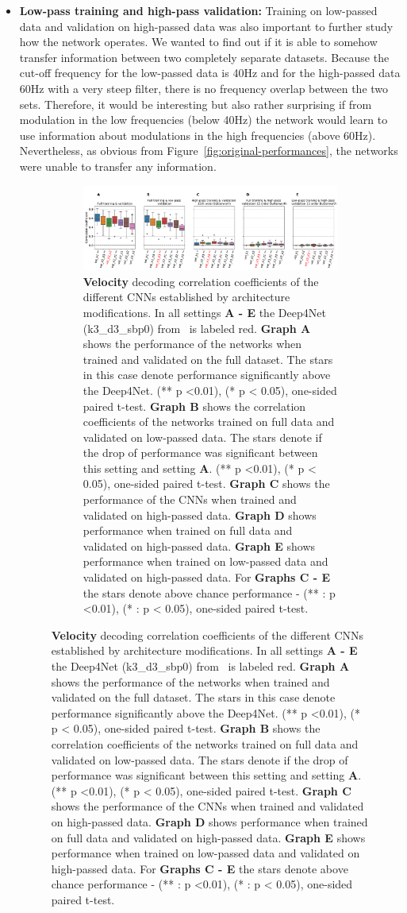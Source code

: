 \begin{itemize}
    The conclusion that the network, when given access to, utilizes primarily information from the low end of the frequency spectrum can be drawn from this result.
    \item \textbf{Low-pass training and high-pass validation:}
    Training on low-passed data and validation on high-passed data was also important to further study how the network operates.
    We wanted to find out if it is able to somehow transfer information between two completely separate datasets.
    Because the cut-off frequency for the low-passed data is 40Hz and for the high-passed data 60Hz with a very steep filter, there is no frequency overlap between the two sets.
    Therefore, it would be interesting but also rather surprising if from modulation in the low frequencies (below 40Hz) the network would learn to use information about modulations in the high frequencies (above 60Hz).
    Nevertheless, as obvious from Figure~\ref{fig:original-performances}, the networks were unable to transfer any information.
    
\begin{figure}[!htpb]
\centering
\begin{subfigure}[b]{\textwidth}
   \includegraphics[width=1\linewidth]{img/ch4/original_setting_vel_performance_comparison}
   \caption{\textbf{Velocity} decoding correlation coefficients of the different CNNs established by architecture modifications. In all settings \textbf{
   A - E} the Deep4Net (k3\_d3\_sbp0) from~\cite{Hammer-2021} is labeled red. \textbf{Graph A} shows the performance of the networks when trained and validated on the full dataset. The stars in this case denote performance significantly above the Deep4Net. (** p <0.01), (* p < 0.05), one-sided paired t-test.
   \textbf{Graph B} shows the correlation coefficients of the networks trained on full data and validated on low-passed data. 
   The stars denote if the drop of performance was significant between this setting and setting \textbf{A}. (** p <0.01), (* p < 0.05), one-sided paired t-test.
   \textbf{Graph C} shows the performance of the CNNs when trained and validated on high-passed data. \textbf{Graph D} shows performance when trained on full data and validated on high-passed data. \textbf{Graph E} shows performance when trained on low-passed data and validated on high-passed data. For \textbf{Graphs C - E} the stars denote above chance performance - (** : p <0.01), (* : p < 0.05), one-sided paired t-test.}
   \label{fig:original-performances-velocity} 
\end{subfigure}


\end{figure}
\end{itemize}
